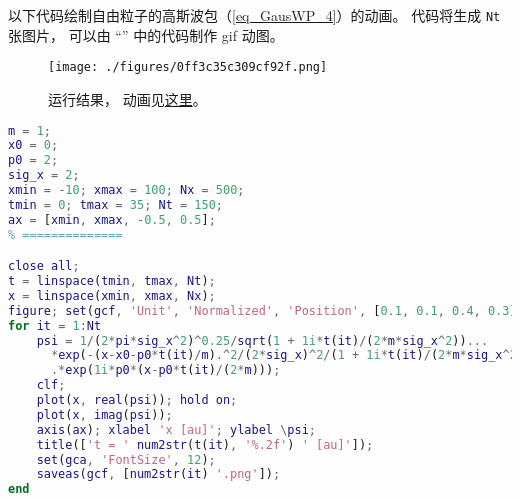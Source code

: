 
\begin{issues}
\issueDraft
\end{issues}


以下代码绘制自由粒子的高斯波包（\autoref{eq_GausWP_4}）的动画。 代码将生成 \verb|Nt| 张图片， 可以由 “” 中的代码制作 gif 动图。

\begin{figure}[ht]
\centering
\texttt{[image: ./figures/0ff3c35c309cf92f.png]}
\caption{运行结果， 动画见\href{https://wuli.wiki/apps/free_gauss.html}{这里}。} \label{fig_FreeGs_1}
\end{figure}

\begin{lstlisting}[language=matlab, caption=free\_gauss.m]
% === 参数 (原子单位) ===
m = 1;
x0 = 0;
p0 = 2;
sig_x = 2;
xmin = -10; xmax = 100; Nx = 500;
tmin = 0; tmax = 35; Nt = 150;
ax = [xmin, xmax, -0.5, 0.5];
% ==============

close all;
t = linspace(tmin, tmax, Nt);
x = linspace(xmin, xmax, Nx);
figure; set(gcf, 'Unit', 'Normalized', 'Position', [0.1, 0.1, 0.4, 0.3]);
for it = 1:Nt
    psi = 1/(2*pi*sig_x^2)^0.25/sqrt(1 + 1i*t(it)/(2*m*sig_x^2))...
      *exp(-(x-x0-p0*t(it)/m).^2/(2*sig_x)^2/(1 + 1i*t(it)/(2*m*sig_x^2)))...
      .*exp(1i*p0*(x-p0*t(it)/(2*m)));
    clf;
    plot(x, real(psi)); hold on;
    plot(x, imag(psi));
    axis(ax); xlabel 'x [au]'; ylabel \psi;
    title(['t = ' num2str(t(it), '%.2f') ' [au]']);
    set(gca, 'FontSize', 12);
    saveas(gcf, [num2str(it) '.png']);
end
\end{lstlisting}
